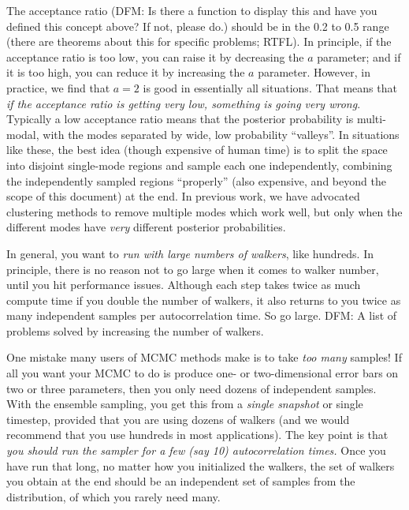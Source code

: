 \documentclass[12pt,preprint]{aastex}
\begin{document}
The acceptance ratio (DFM: Is there a function to display this and
have you defined this concept above?  If not, please do.)  should be
in the 0.2 to 0.5 range (there are theorems about this for specific
problems; RTFL).  In principle, if the acceptance ratio is too low,
you can raise it by decreasing the $a$ parameter; and if it is too
high, you can reduce it by increasing the $a$ parameter.  However, in
practice, we find that $a=2$ is good in essentially all situations.
That means that \emph{if the acceptance ratio is getting very low,
  something is going very wrong}.  Typically a low acceptance ratio
means that the posterior probability is multi-modal, with the modes
separated by wide, low probability ``valleys''.  In situations like
these, the best idea (though expensive of human time) is to split the
space into disjoint single-mode regions and sample each one
independently, combining the independently sampled regions
``properly'' (also expensive, and beyond the scope of this document)
at the end.  In previous work, we have advocated clustering methods to
remove multiple modes \citep{Hou:2011} which work well, but only when
the different modes have \emph{very} different posterior
probabilities.

In general, you want to \emph{run with large numbers of walkers}, like
hundreds.  In principle, there is no reason not to go large when it
comes to walker number, until you hit performance issues.  Although
each step takes twice as much compute time if you double the number of
walkers, it also returns to you twice as many independent samples per
autocorrelation time.  So go large.  DFM: A list of problems solved by
increasing the number of walkers.

One mistake many users of MCMC methods make is to take \emph{too many}
samples!  If all you want your MCMC to do is produce one- or
two-dimensional error bars on two or three parameters, then you only
need dozens of independent samples.  With the ensemble sampling, you
get this from a \emph{single snapshot} or single timestep, provided
that you are using dozens of walkers (and we would recommend that you
use hundreds in most applications).  The key point is that \emph{you
  should run the sampler for a few (say 10) autocorrelation times.}
Once you have run that long, no matter how you initialized the
walkers, the set of walkers you obtain at the end should be an
independent set of samples from the distribution, of which you rarely
need many.
\end{document}
